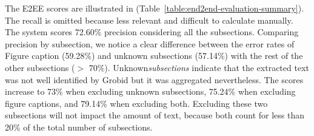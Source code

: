 \documentclass[]{interact}
\theoremstyle{plain}%
\theoremstyle{definition}
\theoremstyle{remark}
\begin{document}
The E2EE scores are illustrated in (Table~\ref{table:end2end-evaluation-summary}).
The recall is omitted because less relevant and difficult to calculate manually.
The system scores 72.60\% precision considering all the subsections.
Comparing precision by subsection, we notice a clear difference between the error rates of Figure caption (59.28\%) and unknown subsections (57.14\%) with the rest of the other subsections ($>$ 70\%).
Unknown\textit{subsections} indicate that the extracted text was not well identified by Grobid but it was aggregated nevertheless.
The scores increase to 73\% when excluding unknown subsections, 75.24\% when excluding figure captions, and 79.14\%  when excluding both.
Excluding these two subsections will not impact the amount of text, because both count for less than 20\% of the total number of subsections.


\begin{table}[ht]
    \centering
    \label{table:end2end-evaluation-summary}
\end{table}
\end{document}

